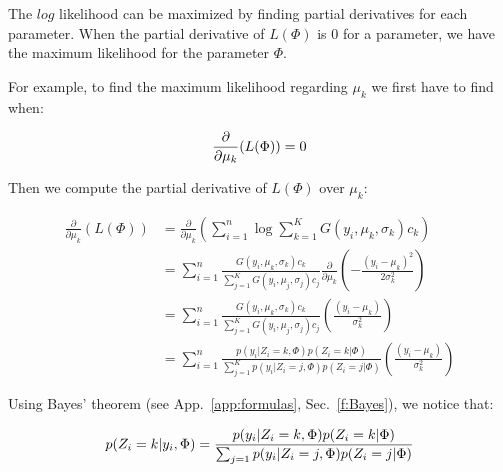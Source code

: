 The $log$ likelihood can be maximized by finding partial derivatives for each parameter. When the partial derivative of $L(\Phi)$ is $0$ for a parameter, we have the maximum likelihood for the parameter $\Phi$.
\par
For example, to find the maximum likelihood regarding $\mu_k$ we first have to find when:

  \begin{equation*}\label{PD}
  \frac{\partial}{\partial\mu_k}(L(\Phi))=0\\
  \end{equation*}

\par
Then we compute the partial derivative of $L(\Phi)$ over $\mu_k$:

  \begin{align}\label{partialDerivative}
  \frac{\partial}{\partial\mu_k}(L(\Phi)) &= \frac{\partial}{\partial\mu_k}( \sum_{i=1}^n \operatorname*{log} \sum_{k=1}^K G(y_i,\mu_k,\sigma_k)c_k\nonumber)  \\
                                          &= \sum_{i=1}^n \frac{G(y_i,\mu_k,\sigma_k)c_k}{\sum_{j=1}^K G(y_i,\mu_j,\sigma_j)c_j}\frac{\partial}{\partial\mu_k}  (-\frac{(y_i-\mu_k)^2}{2\sigma_k^2}) \nonumber \\
                                          &= \sum_{i=1}^n \frac{G(y_i,\mu_k,\sigma_k)c_k}{\sum_{j=1}^K G(y_i,\mu_j,\sigma_j)c_j}(\frac{(y_i-\mu_k)}{\sigma_k^2}) \nonumber \\
                                          &= \sum_{i=1}^n \frac{p(y_i|Z_i=k,\Phi)p(Z_i=k|\Phi)}{\sum_{j=1}^K p(y_i|Z_i=j,\Phi)p(Z_i=j|\Phi)}(\frac{(y_i-\mu_k)} {\sigma_k^2})
  \end{align}

Using Bayes' theorem (see App.~\ref{app:formulas}, Sec.~\ref{f:Bayes}), we notice that:

  \begin{equation}\label{BF}
  p(Z_i=k|y_i,\Phi)= \frac{p(y_i|Z_i=k,\Phi)p(Z_i=k|\Phi)}{\sum_{j=1} p(y_i|Z_i=j,\Phi)p(Z_i=j|\Phi)}\\
  \end{equation}

